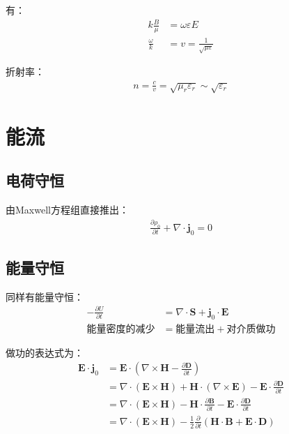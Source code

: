 \documentclass[12pt,onecolumn,a4paper]{book}
\numberwithin{table}{subsection}
\numberwithin{equation}{subsection}
\begin{document}
    有：
    \begin{align}
        k \frac{B}{\mu}  & = \omega \varepsilon E                 \\
        \frac{\omega}{k} & = v = \frac{1}{\sqrt{\mu \varepsilon}}
    \end{align}

    折射率：
    \begin{align}
        n = \frac{c}{v} = \sqrt{\mu_r \varepsilon_r} \sim \sqrt{\varepsilon_r}
    \end{align}

    \section{能流}

    \subsection{电荷守恒}

    由Maxwell方程组直接推出：
    \begin{align}
        \frac{\partial \rho_0}{\partial t} + \nabla \cdot \mathbf{j}_0 = 0
    \end{align}

    \subsection{能量守恒}

    同样有能量守恒：
    \begin{align}
        - \frac{\partial U}{\partial t} & = \nabla \cdot \mathbf{S} + \mathbf{j}_0 \cdot \mathbf{E} \\
        \text{能量密度的减少}                  & = \text{能量流出} + \text{对介质做功}
    \end{align}

    做功的表达式为：
    \begin{align}
        \mathbf{E}\cdot \mathbf{j}_0 & = \mathbf{E}\cdot (\nabla \times \mathbf{H} - \frac{\partial \mathbf{D}}{\partial t})                                                                        \\
                                     & = \nabla\cdot (\mathbf{E} \times \mathbf{H})+\mathbf{H}\cdot (\nabla \times \mathbf{E})  - \mathbf{E}\cdot \frac{\partial \mathbf{D}}{\partial t}            \\
                                     & = \nabla\cdot (\mathbf{E} \times \mathbf{H}) - \mathbf{H}\cdot \frac{\partial \mathbf{B}}{\partial t}-\mathbf{E}\cdot \frac{\partial \mathbf{D}}{\partial t} \\
                                     & = \nabla\cdot (\mathbf{E} \times \mathbf{H}) - \frac{1}{2}\frac{\partial}{\partial t} (\mathbf{H}\cdot \mathbf{B}+\mathbf{E}\cdot \mathbf{D})
    \end{align}
\end{document}
